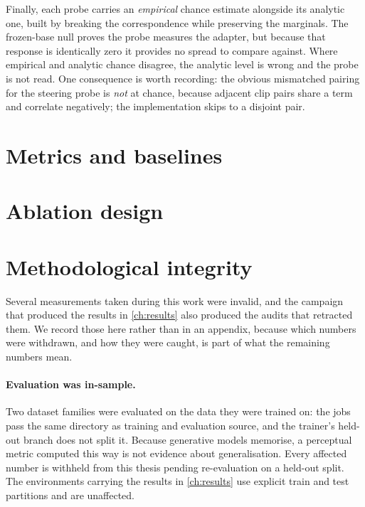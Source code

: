 Finally, each probe carries an \emph{empirical} chance estimate alongside
its analytic one, built by breaking the correspondence while preserving the
marginals. The frozen-base null proves the probe measures the adapter, but
because that response is identically zero it provides no spread to compare
against. Where empirical and analytic chance disagree, the analytic level is
wrong and the probe is not read. One consequence is worth recording: the
obvious mismatched pairing for the steering probe is \emph{not} at chance,
because adjacent clip pairs share a term and correlate negatively; the
implementation skips to a disjoint pair.

\section{Metrics and baselines}
\label{sec:metrics}

\section{Ablation design}
\label{sec:ablation}

\section{Methodological integrity}
\label{sec:integrity}

Several measurements taken during this work were invalid, and the campaign
that produced the results in \cref{ch:results} also produced the audits that
retracted them. We record those here rather than in an appendix, because
which numbers were withdrawn, and how they were caught, is part of
what the remaining numbers mean.

\paragraph{Evaluation was in-sample.} Two dataset families were evaluated on
the data they were trained on: the jobs pass the same directory as training
and evaluation source, and the trainer's held-out branch does not split it.
Because generative models memorise, a perceptual metric computed this way is
not evidence about generalisation. Every affected number is withheld from
this thesis pending re-evaluation on a held-out split. The environments
carrying the results in \cref{ch:results} use explicit train and test
partitions and are unaffected.

